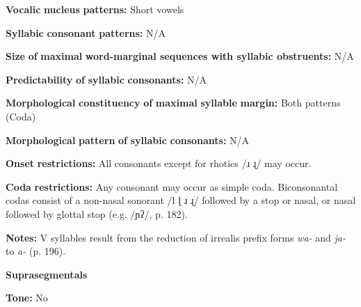 \documentclass[output=paper]{langsci/langscibook}
\begin{document}
\begin{styleBody}
\textbf{Vocalic} \textbf{nucleus} \textbf{patterns:} Short vowels
\end{styleBody}

\begin{styleBody}
\textbf{Syllabic} \textbf{consonant} \textbf{patterns:} N/A
\end{styleBody}

\begin{styleBody}
\textbf{Size} \textbf{of} \textbf{maximal} \textbf{word{}-marginal sequences with syllabic obstruents:} N/A
\end{styleBody}

\begin{styleBody}
\textbf{Predictability} \textbf{of} \textbf{syllabic} \textbf{consonants:} N/A
\end{styleBody}

\begin{styleBody}
\textbf{Morphological} \textbf{constituency} \textbf{of} \textbf{maximal} \textbf{syllable} \textbf{margin:} Both patterns (Coda)
\end{styleBody}

\begin{styleBody}
\textbf{Morphological} \textbf{pattern} \textbf{of} \textbf{syllabic} \textbf{consonants:} N/A
\end{styleBody}

\begin{styleBody}
\textbf{Onset} \textbf{restrictions:} All consonants except for rhotics /ɹ ɻ/ may occur.
\end{styleBody}

\begin{styleBody}
\textbf{Coda} \textbf{restrictions:} Any consonant may occur as simple coda. Biconsonantal codas consist of a non-nasal sonorant /l ɭ ɹ ɻ/ followed by a stop or nasal, or nasal followed by glottal stop (e.g. /ɲʔ/, p. 182).
\end{styleBody}

\begin{styleBody}
\textbf{Notes:} V syllables result from the reduction of irrealis prefix forms \textit{wa-} and \textit{ja-} to \textit{a-} (p. 196).
\end{styleBody}

\begin{styleBody}
\textbf{Suprasegmentals}
\end{styleBody}

\begin{styleBody}
\textbf{Tone:} No
\end{styleBody}
\end{document}
